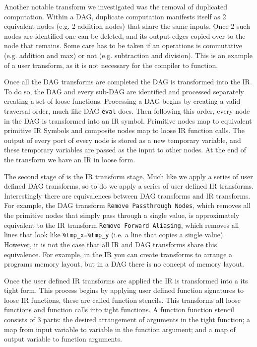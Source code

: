 Another notable transform we investigated was the removal of duplicated computation.
Within a DAG, duplicate computation manifests itself as 2 equivalent nodes (e.g. 2 addition nodes) that share the same inputs.
Once 2 such nodes are identified one can be deleted, and its output edges copied over to the node that remains.
Some care has to be taken if an operations is commutative (e.g. addition and max) or not (e.g. subtraction and division).
This is an example of a user transform, as it is not necessary for the compiler to function.

Once all the DAG transforms are completed the DAG is transformed into the IR.
To do so, the DAG and every sub-DAG are identified and processed separately creating a set of loose functions.
Processing a DAG begins by creating a valid traversal order, much like DAG \texttt{eval} does.
Then following this order, every node in the DAG is transformed into an IR symbol.
Primitive nodes map to equivalent primitive IR Symbols and composite nodes map to loose IR function calls.
The output of every port of every node is stored as a new temporary variable, and these temporary variables are passed as the input to other nodes.
At the end of the transform we have an IR in loose form.

The second stage of \phlat is the IR transform stage.
Much like we apply a series of user defined DAG transforms, so to do we apply a series of user defined IR transforms.
Interestingly there are equivalences between DAG transforms and IR transforms.
For example, the DAG transform \texttt{Remove Passthrough Nodes}, which removes all the primitive nodes that simply pass through a single value, is approximately equivalent to the IR transform \texttt{Remove Forward Aliasing}, which removes all lines that look like \lstinline{%tmp_x=%tmp_y} (i.e. a line that copies a single value).
However, it is not the case that all IR and DAG transforms share this equivalence.
For example, in the IR you can create transforms to arrange a programs memory layout, but in a DAG there is no concept of memory layout.

Once the user defined IR transforms are applied the IR is transformed into a its tight form.
This process begins by applying user defined function signatures to loose IR functions, these are called function stencils.
This transforms all loose functions and function calls into tight functions.
A function function stencil consists of 3 parts: the desired arrangement of arguments in the tight function; a map from input variable to variable in the function argument; and a map of output variable to function arguments.

